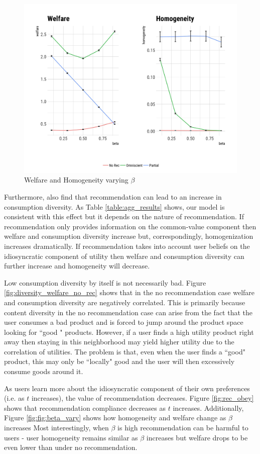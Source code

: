 \documentclass[sigconf]{acmart}
\begin{document}
\begin{figure}
\includegraphics[scale=0.05]{figures/welfare_homo_combo}
\caption{Welfare and Homogeneity varying $\beta$}
\label{fig:beta_vary}
\end{figure}
\par
Furthermore, \cite{nguyen2014exploring} also find that recommendation can lead to an increase in consumption diversity. As Table \ref{table:agg_results} shows, our model is consistent with this effect but it depends on the nature of recommendation. If recommendation only provides information on the common-value component then welfare and consumption diversity increase but, correspondingly, homogenization increases dramatically. If recommendation takes into account user beliefs on the idiosyncratic  component of utility then welfare and consumption diversity can further increase and homogeneity will decrease.
\par
Low consumption diversity by itself is not necessarily bad. Figure \ref{fig:diversity_welfare_no_rec} shows that in the no recommendation case welfare and consumption diversity are negatively correlated. This is primarily because content diversity in the no recommendation case can arise from the fact that the user consumes a bad product and is forced to jump around the product space looking for ``good " products. However, if a user finds a high utility product right away then staying in this neighborhood may yield higher utility due to the correlation of utilities. The problem is that, even when the user finds a ``good" product, this may only be ``locally" good and the user will then excessively consume goods around it.
\par
As users learn more about the idiosyncratic component of their own preferences (i.e. as $t$ increases), the value of recommendation decreases. Figure \ref{fig:rec_obey} shows that recommendation compliance decreases as $t$ increases. Additionally, Figure \ref{fig:fig:beta_vary} shows how homogeneity and welfare change as $\beta$ increases  Most interestingly, when $\beta$ is high recommendation can be harmful to users - user homogeneity remains similar as $\beta$ increases but welfare drops to be even lower than under no recommendation.
\end{document}
